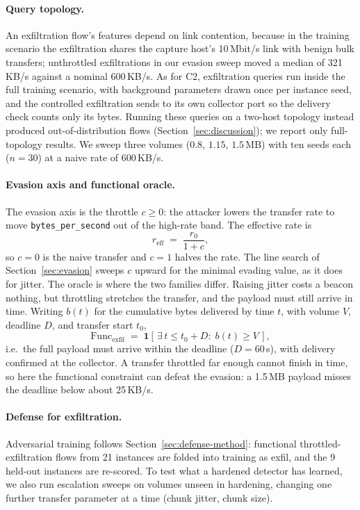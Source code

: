 \documentclass[preprint,12pt]{elsarticle}
\begin{document}
\paragraph{Query topology.} An exfiltration flow's features depend on link contention, because in the
training scenario the exfiltration shares the capture host's 10\,Mbit/s link with benign bulk
transfers; unthrottled exfiltrations in our evasion sweep moved a median of 321\,KB/s against a nominal
600\,KB/s. As for C2, exfiltration queries run inside the full training scenario, with background
parameters drawn once per instance seed, and the controlled exfiltration sends to its own collector
port so the delivery check counts only its bytes. Running these queries on a two-host topology instead
produced out-of-distribution flows (Section~\ref{sec:discussion}); we report only full-topology results.
We sweep three volumes ($0.8$, $1.15$, $1.5$\,MB) with ten seeds each ($n=30$) at a naive rate of
$600$\,KB/s.

\paragraph{Evasion axis and functional oracle.} The evasion axis is the throttle $c\ge 0$: the
attacker lowers the transfer rate to move \texttt{bytes\_per\_second} out of the high-rate band. The
effective rate is
\begin{equation}
r_{\mathrm{eff}} \;=\; \frac{r_{0}}{1+c},
\label{eq:throttle}
\end{equation}
so $c=0$ is the naive transfer and $c=1$ halves the rate. The line search of Section~\ref{sec:evasion}
sweeps $c$ upward for the minimal evading value, as it does for jitter. The oracle is where the two
families differ. Raising jitter costs a beacon nothing, but throttling stretches the transfer, and the
payload must still arrive in time. Writing $b(t)$ for the cumulative bytes delivered by time $t$, with
volume $V$, deadline $D$, and transfer start $t_0$,
\begin{equation}
\mathrm{Func}_{\mathrm{exfil}} \;=\; \mathbf{1}\!\left[\,\exists\, t \le t_0 + D :\; b(t) \ge V\,\right],
\label{eq:exfil-oracle}
\end{equation}
i.e.\ the full payload must arrive within the deadline ($D=60$\,s), with delivery confirmed at the
collector. A transfer throttled far enough cannot finish in time, so here the functional constraint can
defeat the evasion: a 1.5\,MB payload misses the deadline below about 25\,KB/s.

\paragraph{Defense for exfiltration.} Adversarial training follows Section~\ref{sec:defense-method}:
functional throttled-exfiltration flows from 21 instances are folded into training as exfil, and the 9
held-out instances are re-scored. To test what a hardened detector has learned, we also run escalation
sweeps on volumes unseen in hardening, changing one further transfer parameter at a time (chunk
jitter, chunk size).
\end{document}
